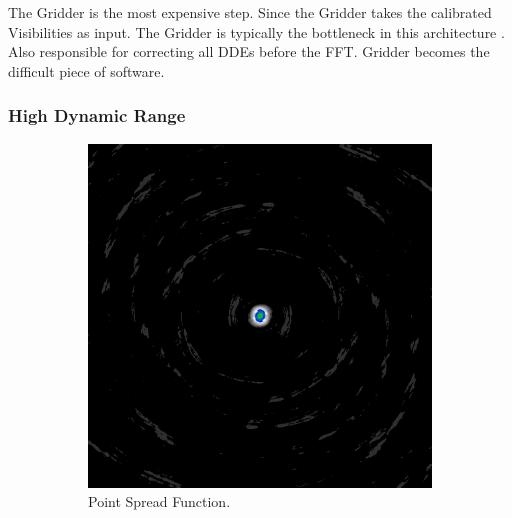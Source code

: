 The Gridder is the most expensive step. 
Since the Gridder takes the calibrated Visibilities as input. The Gridder is typically the bottleneck in this architecture \cite{skastuff}.
Also responsible for correcting all DDEs before the FFT. Gridder becomes the difficult piece of software.


\subsubsection{High Dynamic Range}
\begin{figure}[h]
	\centering
	\begin{subfigure}[b]{0.3\linewidth}
		\includegraphics[width=\linewidth]{./chapters/01.intro/mk2/psf.png}
		\caption{Point Spread Function.}
		\label{results:points:tclean}
	\end{subfigure}
	\begin{subfigure}[b]{0.3\linewidth}

\end{subfigure}
\end{figure}
